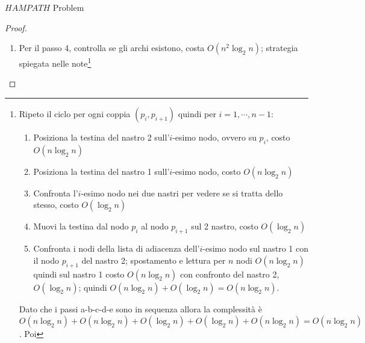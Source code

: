 \documentclass{article}  %
\theoremstyle{definition}
\begin{document}
\begin{theorem}{$HAMPATH$ Problem}
\begin{proof}
\begin{enumerate}
{\begin{enumerate}
					      \item Copio il valore di $s$ dal nastro 1 al nastro 3. La testina del nastro 1 deve fare al massimo $O(n\log_2n)$ spostamenti
					            per arrivare al valore di $s$, poi copiarlo sul nastro 3 costa $O(\log_2n)$. Quindi $O(n\log_2n)+O(\log_2n)=O(n\log_2n)$
					      \item Copio il valore di $t$ dal nastro 1 al nastro 3, stesso costo $O(n\log_2n)$
					      \item Confronto $p_n$ del nastro 2 con $t$ sul nastro 3 muovendo entrambe le testine verso sinistra, costo $O(\log_2n)$
					      \item Muovo la testina del nastro 2 fino all'inizio della sequenza $O(n\log_2n)$
					      \item Confronto $p_1$ del nastro 2 con $s$ sul nastro 3, costo $O(\log_2n)$
				      \end{enumerate}
				      Dato che i passi sono sequenziali, il costo complessivo è: $O(n\log_2n)+O(n\log_2n)+O(\log_2n)+O(n\log_2n)+O(\log_2n)=\textcolor{red}{O(n\log_2n)}$\\
			      }.
			\item Per il passo 4, controlla se gli archi esistono, costa $O(n^2\log_2n)$; strategia spiegata nelle note\footnote{
				      Ripeto il ciclo per ogni coppia $(p_i, p_{i+1})$ quindi per $i=1, \cdots, n-1$:
				      \begin{enumerate}
					      \item Posiziona la testina del nastro 2 sull'$i$-esimo nodo, ovvero su $p_i$, costo $O(n\log_2n)$
					      \item Posiziona la testina del nastro 1 sull'$i$-esimo nodo, costo $O(n\log_2n)$
					      \item Confronta l'$i$-esimo nodo nei due nastri per vedere se si tratta dello stesso, costo $O(\log_2n)$
					      \item Muovi la testina dal nodo $p_i$ al nodo $p_{i+1}$ sul 2 nastro, costo $O(\log_2n)$
					      \item Confronta i nodi della lista di adiacenza dell'$i$-esimo nodo sul nastro 1 con il nodo $p_{i+1}$ del nastro 2; spostamento
					            e lettura per $n$ nodi $O(n\log_2n)$ quindi sul nastro 1 costo $O(n\log_2n)$ con confronto del nastro 2, $O(\log_2n)$; quindi
					            $O(n\log_2n)+O(\log_2n)=O(n\log_2n)$.
				      \end{enumerate}
				      Dato che i passi a-b-c-d-e sono in sequenza allora la complessità è $O(n\log_2n)+O(n\log_2n)+O(\log_2n)+O(\log_2n)+O(n\log_2n)=O(n\log_2n)$. Poi
}
\end{enumerate}
\end{proof}
\end{theorem}
\end{document}

